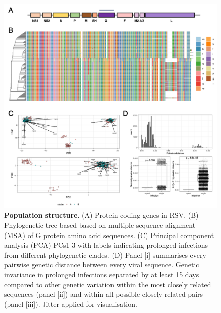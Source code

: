 \documentclass{article} %
\begin{document}
\begin{figure}[ht] \hspace{-0.5cm} 
    \includegraphics[scale=0.8]{f2}
	\caption{\textbf{Population structure}.
(A) Protein coding genes in RSV.
(B) Phylogenetic tree based based on multiple sequence alignment (MSA) of G protein amino acid sequences.
(C) Principal component analysis (PCA) PCs1-3 with labels indicating prolonged infections from different phylogenetic clades.
(D) Panel [i] summarises every pairwise genetic distance between every viral sequence.
Genetic invariance in prolonged infections separated by at least 15 days compared to other genetic variation within the most closely related sequences
(panel [ii]) and within all possible closely related pairs (panel [iii]). Jitter applied for visualisation.}
	\label{fig:2} 
\end{figure}
\clearpage
\end{document}
